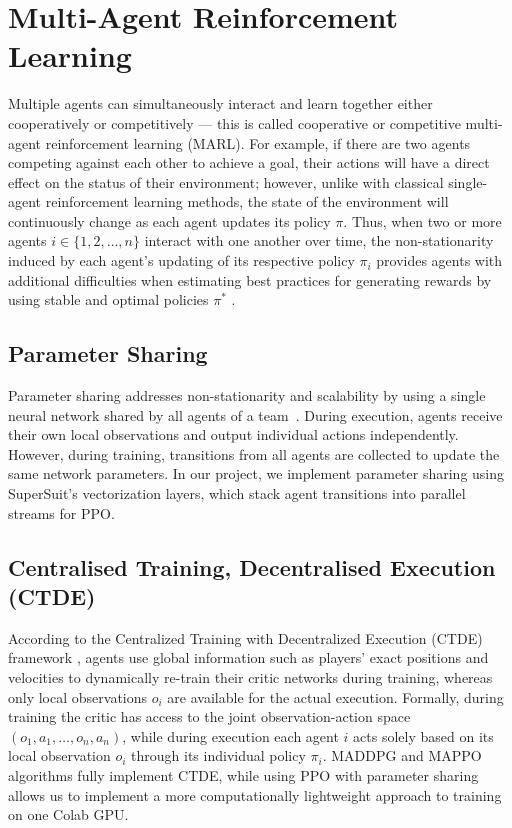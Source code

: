 \section{Multi-Agent Reinforcement Learning}
\label{sec:lit_marl}
Multiple agents can simultaneously interact and learn together either cooperatively or competitively — this is called cooperative or competitive multi-agent reinforcement learning (MARL). For example, if there are two agents competing against each other to achieve a goal, their actions will have a direct effect on the status of their environment; however, unlike with classical single-agent reinforcement learning methods, the state of the environment will continuously change as each agent updates its policy $\pi$. Thus, when two or more agents $i \in \{1, 2, \dots, n\}$ interact with one another over time, the non-stationarity induced by each agent's updating of its respective policy $\pi_i$ provides agents with additional difficulties when estimating best practices for generating rewards by using stable and optimal policies $\pi^*$ \citep{lowe2017multiagent}.

\subsection{Parameter Sharing}

Parameter sharing addresses non-stationarity and scalability by using a single neural network shared by all agents of a team~\citep{gupta2017cooperative}. During execution, agents receive their own local observations and output individual actions independently. However, during training, transitions from all agents are collected to update the same network parameters. In our project, we implement parameter sharing using SuperSuit's vectorization layers, which stack agent transitions into parallel streams for PPO.

\subsection{Centralised Training, Decentralised Execution (CTDE)}

According to the Centralized Training with Decentralized Execution (CTDE) framework \citep{lowe2017multi}, agents use global information such as players' exact positions and velocities to dynamically re-train their critic networks during training, whereas only local observations $o_i$ are available for the actual execution. Formally, during training the critic has access to the joint observation-action space $(o_1, a_1, \dots, o_n, a_n)$, while during execution each agent $i$ acts solely based on its local observation $o_i$ through its individual policy $\pi_i$. MADDPG and MAPPO algorithms fully implement CTDE, while using PPO with parameter sharing allows us to implement a more computationally lightweight approach to training on one Colab GPU.

